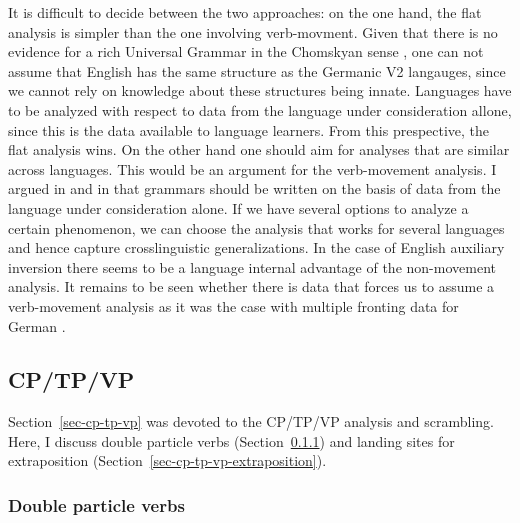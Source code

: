 It is difficult to decide between the two approaches: on the one hand, the flat analysis is simpler
than the one involving verb-movment. Given that there is no evidence for a rich Universal Grammar in
the Chomskyan sense \citep{HCF2002a}, one can not assume that English has the same structure as the
Germanic V2 langauges, since we cannot rely on knowledge about these structures being
innate. Languages have to be analyzed with respect to data from the language under consideration
allone, since this is the data available to language learners. From this prespective, the flat
analysis wins. On the other hand one should aim for analyses that are similar across languages. This
would be an argument for the verb-movement analysis. I argued in  and in
 that grammars should be written on the basis of data from the language under
consideration alone. If we have several options to analyze a certain phenomenon, we can choose the
analysis that works for several languages and hence capture crosslinguistic generalizations. In the
case of English auxiliary inversion there seems to be a language internal advantage of the
non-movement analysis. It remains to be seen whether there is data that forces us to assume a verb-movement
analysis as it was the case with multiple fronting data for German \citep{Mueller2005d,MuellerGS}.





\subsection{CP/TP/VP}
\label{sec-cp-tp-vp-and-verb-last-non-movement}

Section~\ref{sec-cp-tp-vp} was devoted to the CP/TP/VP analysis and
scrambling. Here, I discuss double particle verbs (Section~\ref{sec-cp-tp-vp-double-particles}) and landing sites for extraposition (Section~\ref{sec-cp-tp-vp-extraposition}).

\subsubsection{Double particle verbs}
\label{sec-cp-tp-vp-double-particles}


